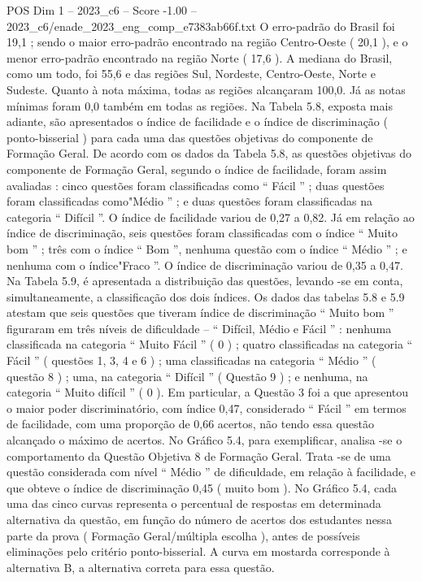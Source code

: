 \begin{textsample}{POS Dim 1 – 2023\_c6 – Score -1.00 – 2023\_c6/enade\_2023\_eng\_comp\_e7383ab66f.txt}
O erro-padrão do Brasil foi 19,1 ; sendo o maior erro-padrão encontrado na região Centro-Oeste ( 20,1 ), e o menor erro-padrão encontrado na região Norte ( 17,6 ).
A mediana do Brasil, como um todo, foi 55,6 e das regiões Sul, Nordeste, Centro-Oeste, Norte e Sudeste.
Quanto à nota máxima, todas as regiões alcançaram 100,0.
Já as notas mínimas foram 0,0 também em todas as regiões.
Na Tabela 5.8, exposta mais adiante, são apresentados o índice de facilidade e o índice de discriminação ( ponto-bisserial ) para cada uma das questões objetivas do componente de Formação Geral.
De acordo com os dados da Tabela 5.8, as questões objetivas do componente de Formação Geral, segundo o índice de facilidade, foram assim avaliadas : cinco questões foram classificadas como “ Fácil ” ; duas questões foram classificadas como"Médio ” ; e duas questões foram classificadas na categoria “ Difícil ”.
O índice de facilidade variou de 0,27 a 0,82.
Já em relação ao índice de discriminação, seis questões foram classificadas com o índice “ Muito bom ” ; três com o índice “ Bom ”, nenhuma questão com o índice “ Médio ” ; e nenhuma com o índice"Fraco ”.
O índice de discriminação variou de 0,35 a 0,47.
Na Tabela 5.9, é apresentada a distribuição das questões, levando -se em conta, simultaneamente, a classificação dos dois índices.
Os dados das tabelas 5.8 e 5.9 atestam que seis questões que tiveram índice de discriminação “ Muito bom ” figuraram em três níveis de dificuldade – “ Difícil, Médio e Fácil ” : nenhuma classificada na categoria “ Muito Fácil ” ( 0 ) ; quatro classificadas na categoria “ Fácil ” ( questões 1, 3, 4 e 6 ) ; uma classificadas na categoria “ Médio ” ( questão 8 ) ; uma, na categoria “ Difícil ” ( Questão 9 ) ; e nenhuma, na categoria “ Muito difícil ” ( 0 ).
Em particular, a Questão 3 foi a que apresentou o maior poder discriminatório, com índice 0,47, considerado “ Fácil ” em termos de facilidade, com uma proporção de 0,66 acertos, não tendo essa questão alcançado o máximo de acertos.
No Gráfico 5.4, para exemplificar, analisa -se o comportamento da Questão Objetiva 8 de Formação Geral.
Trata -se de uma questão considerada com nível “ Médio ” de dificuldade, em relação à facilidade, e que obteve o índice de discriminação 0,45 ( muito bom ).
No Gráfico 5.4, cada uma das cinco curvas representa o percentual de respostas em determinada alternativa da questão, em função do número de acertos dos estudantes nessa parte da prova ( Formação Geral/múltipla escolha ), antes de possíveis eliminações pelo critério ponto-bisserial.
A curva em mostarda corresponde à alternativa B, a alternativa correta para essa questão.

\end{textsample}
